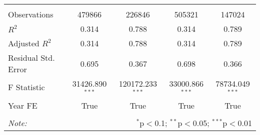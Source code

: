 \begin{tabular}{@{\extracolsep{5pt}}lcccc}
\hline \\[-1.8ex]
 Observations & 479866 & 226846 & 505321 & 147024 \\
 $R^2$ & 0.314 & 0.788 & 0.314 & 0.789 \\
 Adjusted $R^2$ & 0.314 & 0.788 & 0.314 & 0.789 \\
 Residual Std. Error & 0.695  & 0.367  & 0.698  & 0.366  \\
 F Statistic & 31426.890$^{***}$  & 120172.233$^{***}$  & 33000.866$^{***}$  & 78734.049$^{***}$  \\
    Year FE & True & True & True & True \\
\hline
\hline \\[-1.8ex]
\textit{Note:} & \multicolumn{4}{r}{$^{*}$p$<$0.1; $^{**}$p$<$0.05; $^{***}$p$<$0.01} \\
\end{tabular}
